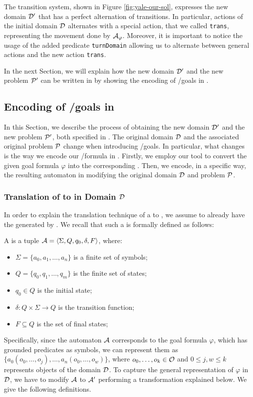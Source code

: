 The transition system, shown in Figure \ref{fig:yale-our-sol}, expresses the new domain $\D'$ that has a perfect alternation of transitions. In particular, actions of the initial domain $\D$ alternates with a special action, that we called \texttt{trans}, representing the movement done by $\automaton_\varphi$. Moreover, it is important to notice the usage of the added predicate \texttt{turnDomain} allowing us to alternate between general actions and the new action \texttt{trans}.

In the next Section, we will explain how the new domain $\D'$ and the new problem $\P'$ can be written in \PDDL by showing the encoding of \LTLf/\PLTL goals in \PDDL.

\subsection{Encoding of \LTLf/\PLTL goals in \PDDL}\label{sec:encoding-goals}
In this Section, we describe the process of obtaining the new domain $\D'$ and the new problem $\P'$, both specified in \PDDL. The original \PDDL domain $\D$ and the associated original problem $\P$ change when introducing \LTLf/\PLTL goals. In particular, what changes is the way we encode our \LTLf/\PLTL formula in \PDDL. Firstly, we employ our \LTLfToDFA tool to convert the given goal formula $\varphi$ into the corresponding \DFA. Then, we encode, in a specific way, the resulting \DFA automaton in \PDDL modifying the original domain $\D$ and problem $\P$.

\subsubsection*{Translation of \DFAs to \PDDL in Domain $\D$}
In order to explain the translation technique of a \DFA to \PDDL, we assume to already have the \DFA generated by \LTLfToDFA. We recall that such a \DFA is formally defined as follows:
\begin{definition}\label{plan:dfa}
A \DFA is a tuple $\automaton = \tup{\Sigma, Q, q_0 , \delta, F}$, where:
\begin{itemize}		
\item $\Sigma = \{ a_0,a_1,\dots,a_n \}$ is a finite set of symbols;
\item $Q = \{ q_0,q_1,\dots,q_m \}$ is the finite set of states;
\item $q_0 \in Q$ is the initial state;
\item $\delta: Q \times \Sigma \rightarrow Q$ is the transition function;
\item $F \subseteq Q$ is the set of final states;
\end{itemize}
\end{definition}
Specifically, since the automaton $\automaton$ corresponds to the goal formula $\varphi$, which has grounded predicates as symbols, we can represent them as $\{a_0(o_0,\dots,o_j),\dots, a_n(o_0,\dots,o_w)\}$, where $o_0,\dots,o_k \in \O$ and $0 \leq j,w \leq k$ represents objects of the domain $\D$. To capture the general representation of $\varphi$ in $\D$, we have to modify $\automaton$ to $\automaton'$ performing a transformation explained below. We give the following definitions.

